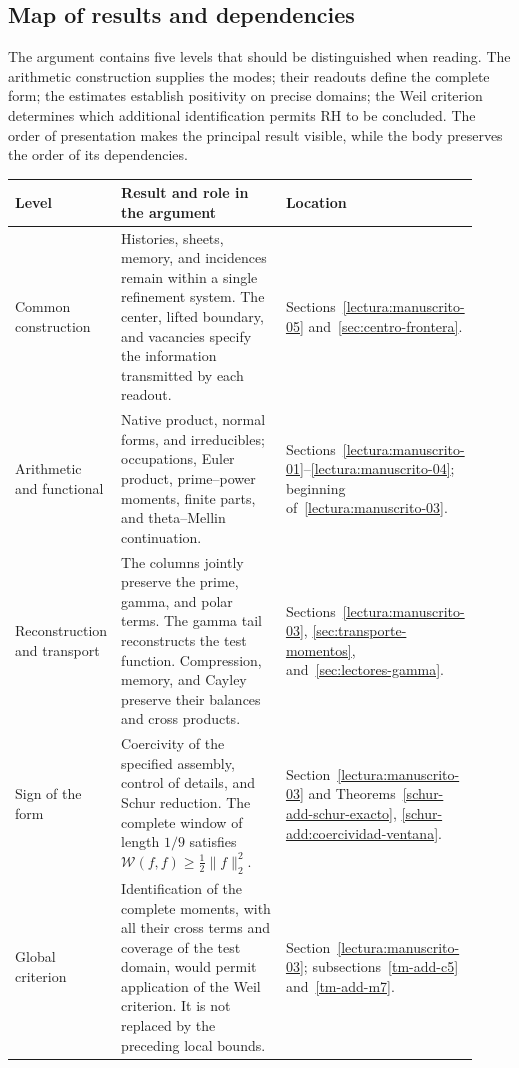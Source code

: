 \subsection*{Map of results and dependencies}
The argument contains five levels that should be distinguished when reading. The arithmetic construction supplies the modes; their readouts define the complete form; the estimates establish positivity on precise domains; the Weil criterion determines which additional identification permits RH to be concluded. The order of presentation makes the principal result visible, while the body preserves the order of its dependencies.

\begin{center}
\renewcommand{\arraystretch}{1.22}
\begin{tabular}{@{}p{0.21\linewidth}p{0.48\linewidth}p{0.23\linewidth}@{}}
\hline
\textbf{Level} & \textbf{Result and role in the argument} & \textbf{Location}\\
\hline
Common construction &
Histories, sheets, memory, and incidences remain within a single refinement system. The center, lifted boundary, and vacancies specify the information transmitted by each readout. &
Sections~\ref{lectura:manuscrito-05} and~\ref{sec:centro-frontera}.\\
Arithmetic and functional &
Native product, normal forms, and irreducibles; occupations, Euler product, prime--power moments, finite parts, and theta--Mellin continuation. &
Sections~\ref{lectura:manuscrito-01}--\ref{lectura:manuscrito-04};
beginning of~\ref{lectura:manuscrito-03}.\\
Reconstruction and transport &
The columns jointly preserve the prime, gamma, and polar terms. The gamma tail reconstructs the test function. Compression, memory, and Cayley preserve their balances and cross products. &
Sections~\ref{lectura:manuscrito-03},
\ref{sec:transporte-momentos}, and~\ref{sec:lectores-gamma}.\\
Sign of the form &
Coercivity of the specified assembly, control of details, and Schur reduction. The complete window of length \(1/9\) satisfies
\(\mathscr W(f,f)\geq\frac12\|f\|_2^2\). &
Section~\ref{lectura:manuscrito-03} and
Theorems~\ref{schur-add-schur-exacto},
\ref{schur-add:coercividad-ventana}.\\
Global criterion &
Identification of the complete moments, with all their cross terms and coverage of the test domain, would permit application of the Weil criterion. It is not replaced by the preceding local bounds. &
Section~\ref{lectura:manuscrito-03};
subsections~\ref{tm-add-c5} and~\ref{tm-add-m7}.\\
\hline
\end{tabular}
\end{center}

